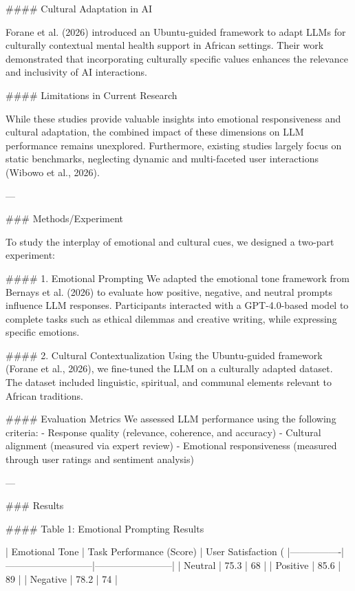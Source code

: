 #### Cultural Adaptation in AI

Forane et al. (2026) introduced an Ubuntu-guided framework to adapt LLMs for culturally contextual mental health support in African settings. Their work demonstrated that incorporating culturally specific values enhances the relevance and inclusivity of AI interactions.

#### Limitations in Current Research

While these studies provide valuable insights into emotional responsiveness and cultural adaptation, the combined impact of these dimensions on LLM performance remains unexplored. Furthermore, existing studies largely focus on static benchmarks, neglecting dynamic and multi-faceted user interactions (Wibowo et al., 2026).

---

### Methods/Experiment

To study the interplay of emotional and cultural cues, we designed a two-part experiment:

#### 1. Emotional Prompting
We adapted the emotional tone framework from Bernays et al. (2026) to evaluate how positive, negative, and neutral prompts influence LLM responses. Participants interacted with a GPT-4.0-based model to complete tasks such as ethical dilemmas and creative writing, while expressing specific emotions.

#### 2. Cultural Contextualization
Using the Ubuntu-guided framework (Forane et al., 2026), we fine-tuned the LLM on a culturally adapted dataset. The dataset included linguistic, spiritual, and communal elements relevant to African traditions.

#### Evaluation Metrics
We assessed LLM performance using the following criteria:
- Response quality (relevance, coherence, and accuracy)
- Cultural alignment (measured via expert review)
- Emotional responsiveness (measured through user ratings and sentiment analysis)

---

### Results  

#### Table 1: Emotional Prompting Results  

| Emotional Tone | Task Performance (Score) | User Satisfaction (%
|----------------|---------------------------|------------------------|  
| Neutral        | 75.3                      | 68                     |  
| Positive       | 85.6                      | 89                     |  
| Negative       | 78.2                      | 74                     |  

